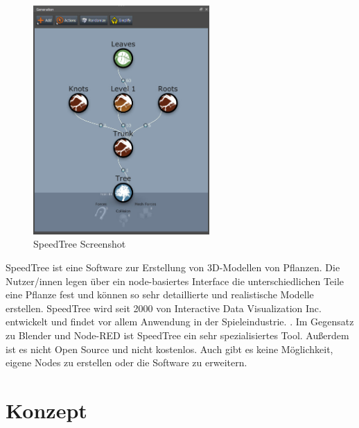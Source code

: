 \documentclass[ngerman]{article}
\begin{document}
\begin{figure}[htbp]
  \centering
  \includegraphics[width=0.6\textwidth]{./graphics/generationeditor_7_speedtree.jpg}
  \caption{SpeedTree Screenshot \cite{speedtreeGettingstartedSpeedTree}}
  \label{fig:blender-repeat}
\end{figure}

SpeedTree ist eine Software zur Erstellung von 3D-Modellen von Pflanzen. Die Nutzer/innen legen über ein node-basiertes Interface die unterschiedlichen Teile eine Pflanze fest und können so sehr detaillierte und realistische Modelle erstellen. SpeedTree wird seit 2000 von Interactive Data Visualization Inc. entwickelt und findet vor allem Anwendung in der Spieleindustrie. \cite{speedtreeGettingstartedSpeedTree}.
\br
Im Gegensatz zu Blender und Node-RED ist SpeedTree ein sehr spezialisiertes Tool. Außerdem ist es nicht Open Source und nicht kostenlos. Auch gibt es keine Möglichkeit, eigene Nodes zu erstellen oder die Software zu erweitern.

\pagebreak

\section{Konzept}
\label{sec:Konzept}
\end{document}
